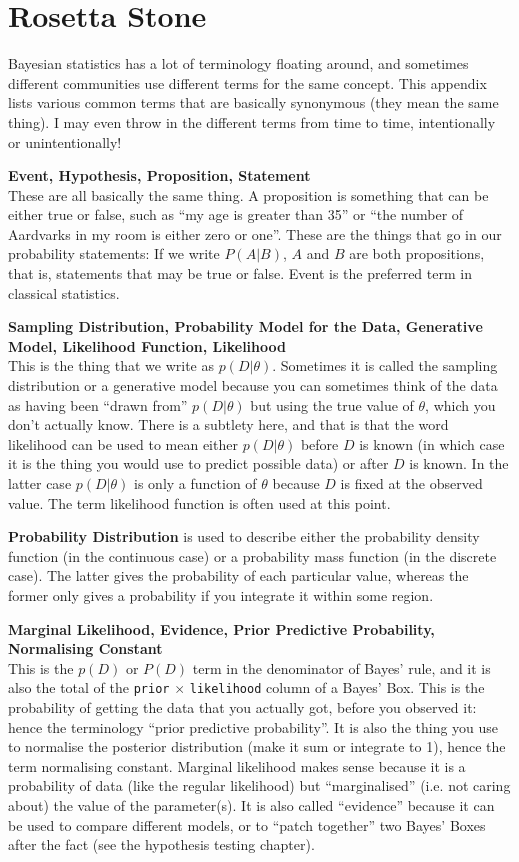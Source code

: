 \chapter{Rosetta Stone}
Bayesian statistics has a lot of terminology floating around, and sometimes
different communities use different terms for the same concept. This appendix
lists various common terms that are basically synonymous (they mean the same thing).
I may even throw in the different terms from time to time, intentionally or
unintentionally!

{\bf Event, Hypothesis, Proposition, Statement}\\
These are all basically the same thing.
A proposition is something that can be either true or false, such as ``my age is
greater than 35'' or ``the number of Aardvarks in my room is either zero or
one''. These are the things that go in our
probability statements: If we write $P(A|B)$, $A$ and $B$ are both propositions,
that is, statements that may be true or false. Event is the preferred term in
classical statistics.

{\bf Sampling Distribution, Probability Model for the Data, 
Generative Model, Likelihood Function, Likelihood}\\
This is the thing that we
write as $p(D|\theta)$. Sometimes it is called the sampling distribution or
a generative model because
you can sometimes think of the data as having been ``drawn from''
$p(D|\theta)$ but using the true value of $\theta$, which you don't actually
know. There is a subtlety here, and that is that the word likelihood can be
used to mean either $p(D|\theta)$ before $D$ is known (in which case it is the
thing you would use to predict possible data) or after $D$ is known. In the latter
case $p(D|\theta)$ is only a function of $\theta$ because $D$ is fixed at the
observed value. The term likelihood function is often used at this point.

{\bf Probability Distribution} is used to describe either the probability density
function (in the continuous case) or a probability mass function (in the discrete
case). The latter gives the probability of each particular value, whereas the
former only gives a probability if you integrate it within some region.

{\bf Marginal Likelihood, Evidence, Prior Predictive Probability, Normalising
Constant}\\ This is the $p(D)$ or $P(D)$ term in the denominator of Bayes' rule,
and it is also the total of the {\tt prior} $\times$ {\tt likelihood} column
of a Bayes' Box. This is the probability of getting the data that you actually got,
before you observed it: hence the terminology ``prior predictive probability''.
It is also the thing you use to normalise the posterior distribution (make it sum
or integrate to 1), hence the term normalising constant. Marginal likelihood makes
sense because it is a probability of data (like the regular likelihood) but
``marginalised'' (i.e. not caring about) the value of the parameter(s). It is
also called ``evidence'' because it can be used to compare different models, or
to ``patch together'' two Bayes' Boxes after the fact (see the hypothesis testing
chapter).


